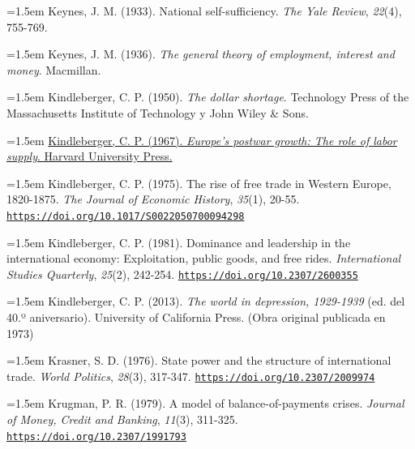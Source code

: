 \documentclass[10pt,a4paper]{article}
\begin{document}
\noindent\hangindent=1.5em Keynes, J. M. (1933). National self-sufficiency. \textit{The Yale Review}, \textit{22}(4), 755-769.

\noindent\hangindent=1.5em Keynes, J. M. (1936). \textit{The general theory of employment, interest and money}. Macmillan.

\noindent\hangindent=1.5em Kindleberger, C. P. (1950). \textit{The dollar shortage}. Technology Press of the Massachusetts Institute of Technology y John Wiley \& Sons.

{\sloppy\noindent\hangindent=1.5em \href{https://www.degruyterbrill.com/document/doi/10.4159/harvard.9780674498181/html}{Kindleberger, C. P. (1967). \textit{Europe's postwar growth: The role of labor supply}. Harvard University Press.}\par}

{\sloppy\noindent\hangindent=1.5em Kindleberger, C. P. (1975). The rise of free trade in Western Europe, 1820-1875. \textit{The Journal of Economic History}, \textit{35}(1), 20-55. \href{https://doi.org/10.1017/S0022050700094298}{\nolinkurl{https://doi.org/10.1017/S0022050700094298}}\par}

{\sloppy\noindent\hangindent=1.5em Kindleberger, C. P. (1981). Dominance and leadership in the international economy: Exploitation, public goods, and free rides. \textit{International Studies Quarterly}, \textit{25}(2), 242-254. \href{https://doi.org/10.2307/2600355}{\nolinkurl{https://doi.org/10.2307/2600355}}\par}

\noindent\hangindent=1.5em Kindleberger, C. P. (2013). \textit{The world in depression, 1929-1939} (ed. del 40.º aniversario). University of California Press. (Obra original publicada en 1973)

{\sloppy\noindent\hangindent=1.5em Krasner, S. D. (1976). State power and the structure of international trade. \textit{World Politics}, \textit{28}(3), 317-347. \href{https://doi.org/10.2307/2009974}{\nolinkurl{https://doi.org/10.2307/2009974}}\par}

{\sloppy\noindent\hangindent=1.5em Krugman, P. R. (1979). A model of balance-of-payments crises. \textit{Journal of Money, Credit and Banking}, \textit{11}(3), 311-325. \href{https://doi.org/10.2307/1991793}{\nolinkurl{https://doi.org/10.2307/1991793}}\par}
\end{document}
